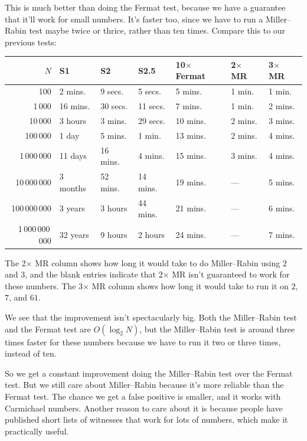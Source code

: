 \documentclass[11pt,paper=letter]{scrartcl}
\begin{document}
This is much better than doing the Fermat test, because we have a guarantee that it'll work for small numbers. It's faster too, since we have to run a Miller--Rabin test maybe twice or thrice, rather than ten times. Compare this to our previous tests:
\begin{center}
\begin{tabular}{rllllll}
$N$              & S1       & S2       & S2.5     & 10$\times$ Fermat & 2$\times$ MR & 3$\times$ MR \\ \hline
100              & 2 mins.  & 9 secs.  & 5 secs.  & 5 mins.  & 1 min.  & 1 min.  \\
1\,000           & 16 mins. & 30 secs. & 11 secs. & 7 mins.  & 1 min.  & 2 mins. \\
10\,000          & 3 hours  & 3 mins.  & 29 secs. & 10 mins. & 2 mins. & 3 mins. \\
100\,000         & 1 day    & 5 mins.  & 1 min.   & 13 mins. & 2 mins. & 4 mins. \\
1\,000\,000      & 11 days  & 16 mins. & 4 mins.  & 15 mins. & 3 mins. & 4 mins. \\
10\,000\,000     & 3 months & 52 mins. & 14 mins. & 19 mins. & ---     & 5 mins. \\
100\,000\,000    & 3 years  & 3 hours  & 44 mins. & 21 mins. & ---     & 6 mins. \\
1\,000\,000\,000 & 32 years & 9 hours  & 2 hours  & 24 mins. & ---     & 7 mins.
\end{tabular}
\end{center}
The 2$\times$ MR column shows how long it would take to do Miller--Rabin using $2$ and $3$, and the blank entries indicate that 2$\times$ MR isn't guaranteed to work for these numbers. The 3$\times$ MR column shows how long it would take to run it on $2$, $7$, and $61$.

We see that the improvement isn't spectacularly big. Both the Miller--Rabin test and the Fermat test are $O(\log_2 N)$, but the Miller--Rabin test is around three times faster for these numbers because we have to run it two or three times, instead of ten.

So we get a constant improvement doing the Miller--Rabin test over the Fermat test. But we still care about Miller--Rabin because it's more reliable than the Fermat test. The chance we get a false positive is smaller, and it works with Carmichael numbers. Another reason to care about it is because people have published short lists of witnesses that work for lots of numbers, which make it practically useful.
\end{document}
